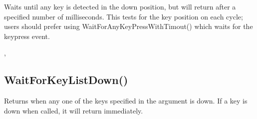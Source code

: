 \documentclass[letterpaper,10pt,english]{sphinxmanual}
\begin{document}
\sphinxAtStartPar
Waits until any key is detected in the down position, but will return   after a specified number of milliseconds.  This tests for the key position on each cycle; users should prefer using WaitForAnyKeyPressWithTimout() which waits for the keypress event.

\sphinxAtStartPar
{}

\begin{sphinxVerbatim}[commandchars=\\\{\}]
\end{sphinxVerbatim}

\sphinxAtStartPar
{}

\sphinxAtStartPar
{}, 

\ignorespaces 

\subsection{WaitForKeyListDown()}
\label{\detokenize{reference/peblenvironment:waitforkeylistdown}}\label{\detokenize{reference/peblenvironment:index-75}}
\sphinxAtStartPar
{}

\sphinxAtStartPar
{}

\sphinxAtStartPar
Returns when any one of the keys specified in the   argument is down. If a key is down when called, it will return immediately.

\sphinxAtStartPar
{}

\begin{sphinxVerbatim}[commandchars=\\\{\}]
\end{sphinxVerbatim}

\sphinxAtStartPar
{}

\begin{sphinxVerbatim}[commandchars=\\\{\}]
\PYG{p}{[}\PYG{p}{]}
\end{sphinxVerbatim}
\end{document}
